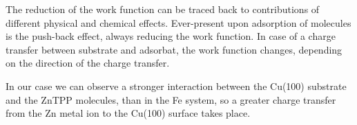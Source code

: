 The reduction of the work function can be traced back to contributions of different physical and chemical effects.
Ever-present upon adsorption of molecules is the push-back effect, always reducing the work function.
In case of a charge transfer between substrate and adsorbat, the work function changes, depending on the direction of the charge transfer. 

In our case we can observe a stronger interaction between the Cu(100) substrate and the ZnTPP molecules, than in the Fe system, so a greater charge transfer from the Zn metal ion to the Cu(100) surface takes place.